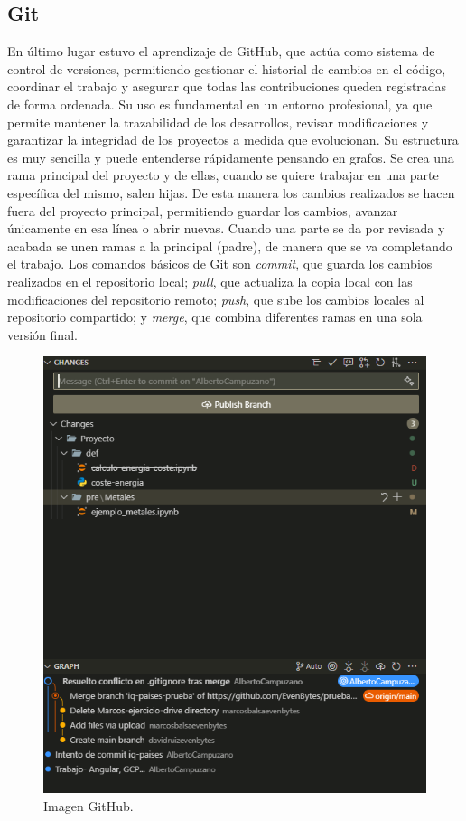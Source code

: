 \subsection{Git}
%
%
En último lugar estuvo el aprendizaje de GitHub, que actúa como sistema de control de versiones, permitiendo gestionar el historial de cambios en el código, coordinar el trabajo y asegurar que todas las contribuciones queden registradas de forma ordenada. Su uso es fundamental en un entorno profesional, ya que permite mantener la trazabilidad de los desarrollos, revisar modificaciones y garantizar la integridad de los proyectos a medida que evolucionan. Su estructura es muy sencilla y puede entenderse rápidamente pensando en grafos. Se crea una rama principal del proyecto y de ellas, cuando se quiere trabajar en una parte específica del mismo, salen hijas. De esta manera los cambios realizados se hacen fuera del proyecto principal, permitiendo guardar los cambios, avanzar únicamente en esa línea o abrir nuevas. Cuando una parte se da por revisada y acabada se unen ramas a la principal (padre), de manera que se va completando el trabajo. Los comandos básicos de Git son \textit{commit}, que guarda los cambios realizados en el repositorio local; \textit{pull}, que actualiza la copia local con las modificaciones del repositorio remoto; \textit{push}, que sube los cambios locales al repositorio compartido; y \textit{merge}, que combina diferentes ramas en una sola versión final.
\begin{figure}[H]
    \centering
    \includegraphics[width=0.42\linewidth]{figuras/captura_github.png}
    \caption[Interfaz de GitHub en Visual Code]{Imagen GitHub.}
    \label{GitHub}
\end{figure}
%
%

